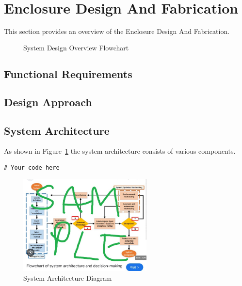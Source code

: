 \section{Enclosure Design And Fabrication}
This section provides an overview of the Enclosure Design And Fabrication.

\begin{figure}[H]
    \centering
    \scalebox{0.8}{ %
        
    }
    \caption{System Design Overview Flowchart}
    \label{fig:decriptiveLabel33} %
\end{figure}

\subsection{Functional Requirements}

\subsection{Design Approach}

\subsection{System Architecture}
As shown in Figure~\ref{fig:decriptiveLabel33} the system architecture consists of various components.

\begin{lstlisting}[style=cstyle, caption=System Architecture Code Example, label=lst:SystemArchitecture9]
# Your code here
\end{lstlisting}

\begin{figure}[htbp] %
    \centering
    \includegraphics[width=0.6\textwidth]{figures/methodology/system_architecture.jpg}
    \caption{System Architecture Diagram}
    \label{fig:system-architecture4}
\end{figure}